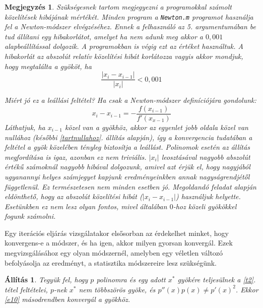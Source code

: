 \documentclass[a4paper,12pt]{report}
\newtheorem{All}[Tet]{Állítás}
\newtheorem{Megj}[Tet]{Megjegyzés}
\begin{document}
				  \begin{Megj}\label{pontossag}Szükségesnek tartom megjegyezni a programokkal számolt közelítések hibájának mértékét. Minden program a  \texttt{Newton.m} programot használja fel a Newton-módszer elvégzéséhez. Ennek a felhasználó az 5. argumentumában be tud állítani egy hibakorlátot, amelyet ha nem adunk meg akkor a $0,\!001$ alapbeállítással dolgozik. A programokban is végig ezt az értéket használtuk. A hibakorlát az abszolút relatív közelítési hibát korlátozza vagyis akkor mondjuk, hogy megtalálta a gyököt, ha\[\frac{|x_i-x_{i-1}|}{|x_i|}<0,\!001\]

Miért jó ez a leállási feltétel? Ha csak a Newton-módszer definíciójára gondolunk:\[x_i-x_{i-1}=-\frac{f(x_{i-1})}{f'(x_{x-1})}\]Láthatjuk, ha $x_{i-1}$ közel van a gyökhöz, akkor az egyenlet jobb oldala közel van nullához (későbbi \ref{tartnullahoz}. állítás alapján), így a konvergencia tudatában a feltétel a gyök közelében tényleg biztosítja a leállást. Polinomok esetén az állítás megfordítása is igaz, azonban ez nem triviális. $|x_i|$ leosztásával nagyobb abszolút értékű számoknál nagyobb hibával dolgozunk, amivel azt érjük el, hogy nagyjából ugyanannyi helyes számjegyet kapjunk eredményeinkben annak nagyságrendjétől függetlenül. Ez természetesen nem minden esetben jó. Megoldandó feladat alapján eldönthető, hogy az abszolút közelítési hibát ($|x_i-x_{i-1}|$) használjuk helyette. Esetünkben ez nem lesz olyan fontos, mivel általában $0$-hoz közeli gyökökkel fogunk számolni.
				\end{Megj}
				Egy iterációs eljárás vizsgálatakor elsősorban az érdekelhet minket, hogy konvergens-e a módszer, és ha igen, akkor milyen gyorsan konvergál. Ezek megvizsgálásához egy olyan módszernél, amelyben egy véletlen változó befolyásolja az eredményt, a statisztika módszereire lesz szükségünk.
				\begin{All}
					Tegyük fel, hogy $p$ polinomra és egy adott $x^*$ gyökére teljesülnek a \ref{t2}. tétel feltételei, $p$-nek $x^*$ nem többszörös gyöke, és $p''(x)p(x)\neq p'(x)^2$. Ekkor \ref{e10} másodrendben konvergál a gyökhöz.
				\end{All}
                
                
                
                
                
                
                
                
                
                
                
\end{document}
